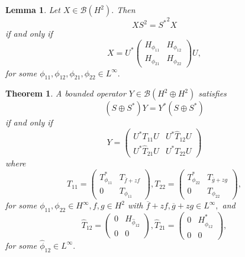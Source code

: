 \documentclass[10pt,a4paper]{amsart}
\newtheorem{theorem}{Theorem}
\newtheorem{lemma}{Lemma}
\begin{document}
        \begin{lemma}\label{special}
            Let $X \in \mathcal{B}(H^2).$ Then 
            $$XS^2={S^*}^2X$$ if and only if $$X=U^*
                \begin{pmatrix}
                H_{\phi_{11}}&H_{\phi_{12}}\\
                H_{\phi_{21}}&H_{\phi_{22}}
                \end{pmatrix}U,$$ 
                for some $\phi_{11}, \phi_{12}, \phi_{21}, \phi_{22} \in L^{\infty}.$
        \end{lemma}

        \begin{theorem}\label{skew is S+S*}
           A bounded operator $Y\in \mathcal{B}(H^2\oplus H^2)$ 
           satisfies
           \begin{equation*}
               (S\oplus S^*)Y=Y^*(S\oplus S^*)
           \end{equation*}
           if and only if 
           \begin{equation}\label{converse skew}
               Y=
               \begin{pmatrix}
                   U^*T_{11}U& U^*\hat{T}_{12}U\\
                   U^*{\hat{T}_{21}}U& U^*T_{22}U
               \end{pmatrix}
           \end{equation}
           where 
           $$T_{11}=
             \begin{pmatrix}
                 T^*_{\phi_{11}}&T_{\overline{f}+zf}\\
                 0&T_{\phi_{11}}
             \end{pmatrix},
             T_{22}=
             \begin{pmatrix}
                T^*_{\phi_{22}}&T_{\overline{g}+zg}\\
                 0&T_{\phi_{22}}
             \end{pmatrix},
             $$
                for some $\phi_{11}, \phi_{22} \in H^\infty, f, g \in H^2$ with ${\overline{f}+zf}, {\overline{g}+zg} \in L^\infty,$ and
             $$
                \hat{T}_{12}=
                \begin{pmatrix}
                0&H_{\hat{\phi}_{12}}\\
                0&0
                \end{pmatrix},
                \hat{T}_{21}=
                \begin{pmatrix}
                0&H^*_{\hat{\phi}_{12}}\\
                0&0
                \end{pmatrix},
            $$
             for some ${\hat{\phi}_{12}} \in L^\infty.$
        \end{theorem}
\end{document}
